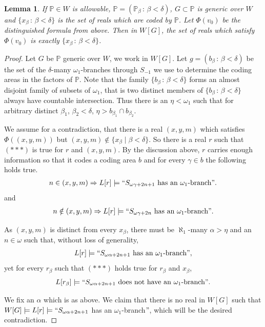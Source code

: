 \documentclass[a4paper,11pt]{article}
\newtheorem{lemma}[theorem]{Lemma}
\newcommand{\forceP}{\mathbb{P}}
\begin{document}
\begin{lemma}\label{nounwantedcodes}
If $\forceP \in W$ is allowable, $\forceP=(\forceP_{\beta} \, : \, \beta < \delta)$, $G \subset \forceP$ is generic over $W$ and $\{ x_{\beta} \, : \, \beta < \delta\}$ is the set of reals which are coded by $\forceP$. Let $\Phi(v_0)$ be the distinguished formula from above. Then
in $W[G]$, the set of reals which satisfy $\Phi(v_0)$ is exactly 
$\{ x_{\beta} \, : \, \beta < \delta\}$.
\end{lemma}
\begin{proof}
Let $G$ be $\forceP$ generic over $W$, we work in $W[G]$. Let $g= (b_{\beta} \, : \, {\beta} < \delta)$ be the set of the $\delta$-many $\omega_1$-branches through $S_{-1}$ we use to determine the coding areas in  the factors of $\forceP$.  Note that the family $\{b_{\beta} \,: \, \beta < \delta \}$ forms an almost disjoint family of subsets of $\omega_1$, that is two distinct members of  $\{b_{\beta} \,: \, \beta < \delta \}$ always have countable intersection. Thus there is an $\eta < \omega_1$ such that for arbitrary distinct $\beta_1$, $\beta_2 < \delta$,  $\eta> b_{\beta_1}\cap b_{\beta_2}$.  


We assume for a contradiction, that there is a real $(x,y,m)$ which satisfies $\Phi ((x,y,m))$ but $(x,y,m) \notin \{x_{\beta} \mid \beta < \delta \}$.
So there is a real $r$ such that $( {\ast} {\ast} {\ast})$ is true for $r$ and $(x,y,m)$. By the discussion above, $r$ carries enough information so that it codes a coding area $b$ and for every $\gamma \in b$ the following holds true.
\begin{align*}
n \in (x,y,m) \Rightarrow L[r] \models  ``S_{\omega \gamma + 2n+1} \text{ has an $\omega_1$-branch}".
\end{align*}
and
\begin{align*}
n \notin (x,y,m) \Rightarrow L[r] \models ``S_{\omega \gamma + 2n} \text{ has an $\omega_1$-branch}".
\end{align*}


As $(x,y,m)$ is distinct from every $x_{\beta}$, there must be $\aleph_1$-many $\alpha > \eta$ and an $n \in \omega$ such that, without loss of generality,
\[L[r] \models ``S_{\omega \alpha + 2n+1} \text{ has an $\omega_1$-branch}",\]
yet for every $r_{\beta}$ such that $({\ast} {\ast} {\ast} )$ holds true for $r_{\beta} $ and $x_{\beta}$,
\[L[r_{\beta}] \models  ``S_{\omega \alpha + 2n+1} \text{ does not have an $\omega_1$-branch}".\]

We fix an $\alpha$ which is as above. We claim  that there is no real in $W[G]$ such that $W[G] \models L[r] \models ``S_{\omega \alpha + 2n+1}$ has an $\omega_1$-branch$"$, which will be the desired contradiction.



\end{proof}
\end{document}
